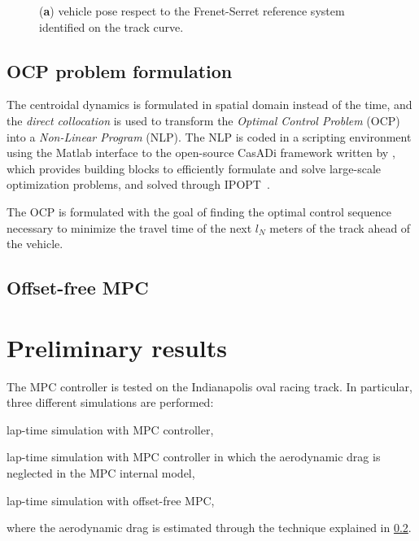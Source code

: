 \documentclass[conference]{IEEEtran} %
\begin{document}
\begin{figure}[htb] \centering
	\caption{(\textbf{a}) vehicle pose respect to the Frenet-Serret reference system identified on the track curve.}
	\label{fig:scheme_frenet_serret}
\end{figure}


\subsection{OCP problem formulation}

The centroidal dynamics is formulated in spatial domain instead of the time, and the \emph{direct collocation} is used to transform the \emph{Optimal Control Problem} (OCP) into a \emph{Non-Linear Program} (NLP). The NLP is coded in a scripting environment using the Matlab interface to the open-source CasADi framework written by \citet{Andersson2019}, which provides building
blocks to efficiently formulate and solve large-scale optimization problems, and solved through IPOPT~\cite{Wachter2006}.

The OCP is formulated with the goal of finding the optimal control sequence necessary to minimize the travel time of the next $l_N$ meters of the track ahead of the vehicle.

\subsection{Offset-free MPC}
\label{sec:offsetfree}



\section{Preliminary results}
The MPC controller is tested on the Indianapolis oval racing track. In particular, three different simulations are performed:
\begin{enumerate*}[label=(\roman*)]
	\item lap-time simulation with MPC controller,
	\item lap-time simulation with MPC controller in which the aerodynamic drag is neglected in the MPC internal model,
	\item lap-time simulation with offset-free MPC,
\end{enumerate*}
where the aerodynamic drag is estimated through the technique explained in \ref{sec:offsetfree}.
\end{document}
